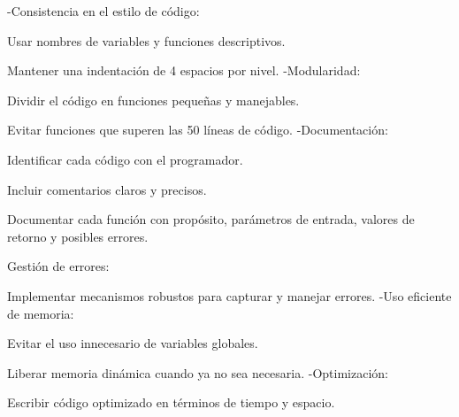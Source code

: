 -\/Consistencia en el estilo de código\+:
\begin{DoxyItemize}
\item Usar nombres de variables y funciones descriptivos.
\item Mantener una indentación de 4 espacios por nivel. -\/Modularidad\+:
\item Dividir el código en funciones pequeñas y manejables.
\item Evitar funciones que superen las 50 líneas de código. -\/Documentación\+:
\item Identificar cada código con el programador.
\item Incluir comentarios claros y precisos.
\item Documentar cada función con propósito, parámetros de entrada, valores de retorno y posibles errores.
\end{DoxyItemize}

Gestión de errores\+:
\begin{DoxyItemize}
\item Implementar mecanismos robustos para capturar y manejar errores. -\/Uso eficiente de memoria\+:
\item Evitar el uso innecesario de variables globales.
\item Liberar memoria dinámica cuando ya no sea necesaria. -\/Optimización\+:
\item Escribir código optimizado en términos de tiempo y espacio. 
\end{DoxyItemize}